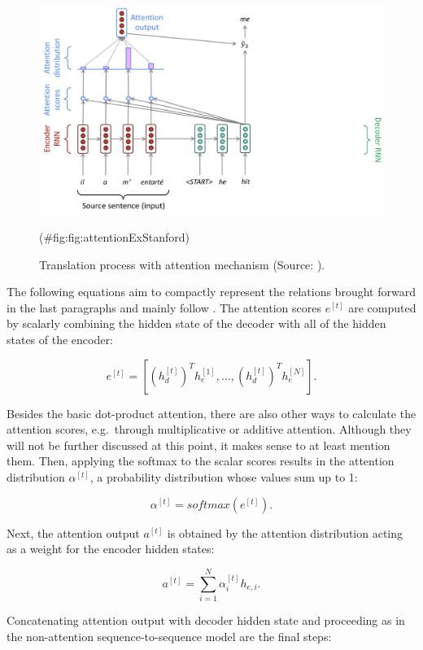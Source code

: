 \documentclass[
]{krantz}
\begin{document}
\begin{figure}

{\centering \includegraphics[width=0.9\linewidth]{./figures/01-01-nlp/attention_ex_stanford} 

}

\caption{Translation process with attention mechanism (Source: \citet{Manning2022}).}(\#fig:fig:attentionExStanford)
\end{figure}



The following equations aim to compactly represent the relations brought
forward in the last paragraphs and mainly follow \citep{Manning2022}. The
attention scores \(e^{[t]}\) are computed by scalarly combining the hidden
state of the decoder with all of the hidden states of the encoder:

\[e^{[t]} = [(h_{d}^{[t]})^T h_{e}^{[1]}, \ldots  , (h_{d}^{[t]})^T h_{e}^{[N]} ].\]

Besides the basic dot-product attention, there are also other ways to
calculate the attention scores, e.g.~through multiplicative or additive
attention. Although they will not be further discussed at this point, it
makes sense to at least mention them. Then, applying the softmax to the
scalar scores results in the attention distribution \(\alpha^{[t]}\), a
probability distribution whose values sum up to 1:

\[\alpha^{[t]} = softmax(e^{[t]}).\]

Next, the attention output \(a^{[t]}\) is obtained by the attention
distribution acting as a weight for the encoder hidden states:

\[a^{[t]} = \sum_{i=1}^{N} \alpha_i^{[t]} h_{e,i}.\]

Concatenating attention output with decoder hidden state and proceeding
as in the non-attention sequence-to-sequence model are the final steps:
\end{document}
